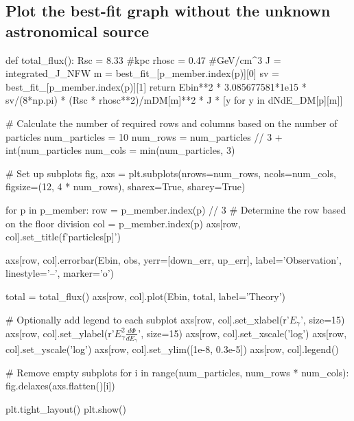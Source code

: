 \documentclass[10pt, oneside]{book}
\numberwithin{equation}{chapter}
\begin{document}
\subsection{Plot the best-fit graph without the unknown astronomical source}
\begin{python}
def total_flux():
    Rsc = 8.33 #kpc
    rhosc = 0.47 #GeV/cm^3
    J = integrated_J_NFW
    m = best_fit_[p_member.index(p)][0]
    sv = best_fit_[p_member.index(p)][1]
    return Ebin**2 * 3.085677581*1e15 * sv/(8*np.pi) * (Rsc * rhosc**2)/mDM[m]**2 * J * [y for y in dNdE_DM[p][m]]


# Calculate the number of required rows and columns based on the number of particles
num_particles = 10
num_rows = num_particles // 3 + int(num_particles %
num_cols = min(num_particles, 3)

# Set up subplots
fig, axs = plt.subplots(nrows=num_rows, ncols=num_cols, figsize=(12, 4 * num_rows), sharex=True, sharey=True)

for p in p_member:
    row = p_member.index(p) // 3  # Determine the row based on the floor division
    col = p_member.index(p) %
    axs[row, col].set_title(f'{particles[p]}')

    axs[row, col].errorbar(Ebin, obs, yerr=[down_err, up_err], label='Observation', linestyle='--', marker='o')

    total = total_flux()
    axs[row, col].plot(Ebin, total, label='Theory')

    # Optionally add legend to each subplot
    axs[row, col].set_xlabel(r'$E_\gamma$', size=15)
    axs[row, col].set_ylabel(r'$E_\gamma^2\frac{d\Phi}{dE_\gamma}$', size=15)
    axs[row, col].set_xscale('log')
    axs[row, col].set_yscale('log')
    axs[row, col].set_ylim([1e-8, 0.3e-5])
    axs[row, col].legend()

# Remove empty subplots
for i in range(num_particles, num_rows * num_cols):
    fig.delaxes(axs.flatten()[i])

plt.tight_layout()
plt.show()
\end{python}
\end{document}
